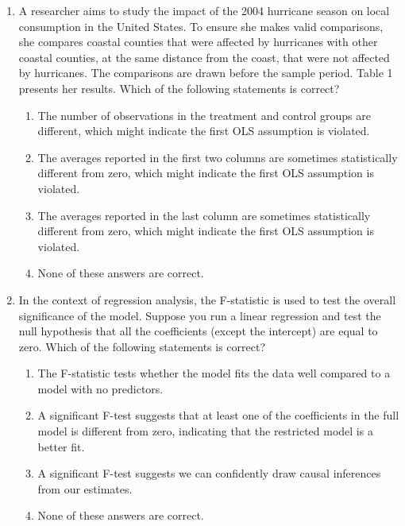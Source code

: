 \documentclass{article}
\begin{document}
\begin{enumerate}
\item A researcher aims to study the impact of the 2004 hurricane season on local consumption in the United States. To ensure she makes valid comparisons, she compares coastal counties that were affected by hurricanes with other coastal counties, at the same distance from the coast, that were not affected by hurricanes. The comparisons are drawn before the sample period. Table 1 presents her results. Which of the following statements is correct?

\begin{enumerate}[label=\alph*)]
\item The number of observations in the treatment and control groups are different, which might indicate the first OLS assumption is violated.
\item  The averages reported in the first two columns are sometimes statistically different from zero,  which might indicate the first OLS assumption is violated.
\item The averages reported in the last column are sometimes statistically different from zero,  which might indicate the first OLS assumption is violated.
\item None of these answers are correct.
\end{enumerate}\vspace{.25cm}

\newpage

\item In the context of regression analysis, the F-statistic is used to test the overall significance of the model. Suppose you run a linear regression and test the null hypothesis that all the coefficients (except the intercept) are equal to zero. Which of the following statements is correct?

\begin{enumerate}[label=\alph*)]
\item The F-statistic tests whether the model fits the data well compared to a model with no predictors.
\item A significant F-test suggests that at least one of the coefficients in the full model is different from zero, indicating that the restricted model is a better fit.
\item A significant F-test suggests we can confidently draw causal inferences from our estimates.
\item None of these answers are correct.
\end{enumerate}\vspace{.25cm}


\end{enumerate}
\end{document}
